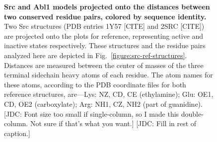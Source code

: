 \documentclass[aps,pre,twocolumn,nofootinbib,superscriptaddress,linenumbers]{revtex4-1}
\begin{document}
\begin{figure}


    \caption{{\bf Src and Abl1 models projected onto the distances between two conserved residue pairs, colored by sequence identity.}
    Two Src structures (PDB entries 1Y57 [CITE] and 2SRC [CITE]) are projected onto the plots for reference, representing active and inactive states respectively.
    These structures and the residue pairs analyzed here are depicted in Fig.~\ref{figure:src-ref-structures}.
    Distances are measured between the center of masses of the three terminal sidechain heavy atoms of each residue.
    The atom names for these atoms, according to the PDB coordinate files for both reference structures, are---Lys: NZ, CD, CE (ethylamine); Glu: OE1, CD, OE2 (carboxylate); Arg: NH1, CZ, NH2 (part of guanidine).
    {\color{red}[JDC: Font size too small if single-column, so I made this double-column. Not sure if that's what you want.]}
    {\color{red}[JDC: Fill in rest of caption.]}
    }
  \label{figure:pair-distances}
\end{figure}

\end{document}
